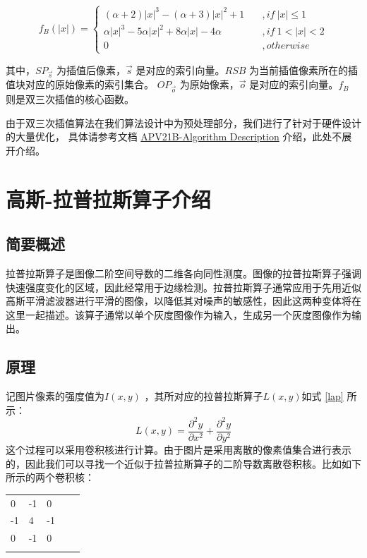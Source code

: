 \documentclass[12pt, a4paper, oneside]{ctexbook}
\begin{document}
	\begin{equation}
		f_B(|x|)=
		\begin{cases}
	(\alpha + 2)|x|^3-(\alpha+3)|x|^2+1\quad &,if\ |x| \leq1\\
	\alpha|x|^3-5\alpha|x|^2+8\alpha|x|-4\alpha\quad&,if \ 1<|x|<2\\
	0&,otherwise				
	\label{bicubic_2}
		\end{cases}
	\end{equation}
	\par
	其中，$SP_{\vec{s}}$ 为插值后像素，$\vec{s}$ 是对应的索引向量。$RSB$ 为当前插值像素所在的插值块对应的原始像素的索引集合。
	$OP_{\vec{o}}$ 为原始像素，$\vec{o}$ 是对应的索引向量。$f_B$ 则是双三次插值的核心函数。
	\par 由于双三次插值算法在我们算法设计中为预处理部分，我们进行了针对于硬件设计的大量优化，
	具体请参考文档 \href{./ref/APV21B_Algorithm_Description.pdf}{APV21B-Algorithm Description} 介绍，此处不展开介绍。
	
	\section{高斯-拉普拉斯算子介绍}
	\subsection{简要概述}
	拉普拉斯算子是图像二阶空间导数的二维各向同性测度。图像的拉普拉斯算子强调快速强度变化的区域，因此经常用于边缘检测。拉普拉斯算子通常应用于先用近似高斯平滑滤波器进行平滑的图像，以降低其对噪声的敏感性，因此这两种变体将在这里一起描述。该算子通常以单个灰度图像作为输入，生成另一个灰度图像作为输出。
	\subsection{原理}
	记图片像素的强度值为$I(x,y)$ ，其所对应的拉普拉斯算子$L(x,y)$如式 \ref{lap} 所示：
	\begin{equation}	\label{lap}
		L(x,y)=\frac{\partial ^2 y}{\partial x^2} + \frac{\partial ^2 y}{\partial y^2}
	\end{equation}
	这个过程可以采用卷积核进行计算。由于图片是采用离散的像素值集合进行表示的，因此我们可以寻找一个近似于拉普拉斯算子的二阶导数离散卷积核。比如如下所示的两个卷积核：
	\begin{table}[h]
		\centering
		\begin{tabular}{lllll}
			\cline{1-3}
			\multicolumn{1}{|l|}{0}  & \multicolumn{1}{l|}{-1} & \multicolumn{1}{l|}{0}  &  &  \\ \cline{1-3}
			\multicolumn{1}{|l|}{-1} & \multicolumn{1}{l|}{4}  & \multicolumn{1}{l|}{-1} &  &  \\ \cline{1-3}
			\multicolumn{1}{|l|}{0}  & \multicolumn{1}{l|}{-1} & \multicolumn{1}{l|}{0}  &  &  \\ \cline{1-3}
			&                         &                         &  & 
		\end{tabular}
	\end{table}
\end{document}
